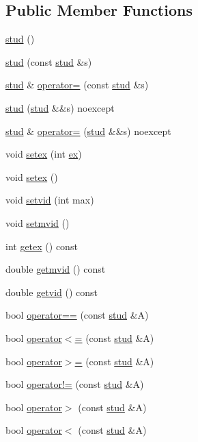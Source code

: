 \subsection*{Public Member Functions}
\begin{DoxyCompactItemize}
\item 
\mbox{\hyperlink{structstud_ab6ed07f01c0452711eccaaa57a75d669}{stud}} ()
\item 
\mbox{\hyperlink{structstud_a5d3f14694ec6a1eb8a20cd8538abadf5}{stud}} (const \mbox{\hyperlink{structstud}{stud}} \&s)
\item 
\mbox{\hyperlink{structstud}{stud}} \& \mbox{\hyperlink{structstud_a5c04ca87f8701c19bd0753345bf66b89}{operator=}} (const \mbox{\hyperlink{structstud}{stud}} \&s)
\item 
\mbox{\hyperlink{structstud_a806a780e55ad061bc78180d74a5c23bf}{stud}} (\mbox{\hyperlink{structstud}{stud}} \&\&s) noexcept
\item 
\mbox{\hyperlink{structstud}{stud}} \& \mbox{\hyperlink{structstud_a206a6086ce2d924230032e923ba8fd6b}{operator=}} (\mbox{\hyperlink{structstud}{stud}} \&\&s) noexcept
\item 
void \mbox{\hyperlink{structstud_af1a38e3c3ec728a5f05f60160ea1da58}{setex}} (int \mbox{\hyperlink{structstud_afa999423735c9497192e041f81d5988b}{ex}})
\item 
void \mbox{\hyperlink{structstud_a078cb288fc9ca808c827a079f0bdf724}{setex}} ()
\item 
void \mbox{\hyperlink{structstud_ae8ce76b8a594db8ed15a0a8116d1aa72}{setvid}} (int max)
\item 
void \mbox{\hyperlink{structstud_a5f882c5ca0c4c5351aaeebc76c86faaa}{setmvid}} ()
\item 
int \mbox{\hyperlink{structstud_a7b9cf0ded33d6a59ef2ef045d70980ba}{getex}} () const
\item 
double \mbox{\hyperlink{structstud_a79c64a6d3b9c76c24593588d30b8c661}{getmvid}} () const
\item 
double \mbox{\hyperlink{structstud_a9c5ae09dd2a7253655547095cb2ecdd1}{getvid}} () const
\item 
bool \mbox{\hyperlink{structstud_af75e6539277cd957250c0f787e1d836a}{operator==}} (const \mbox{\hyperlink{structstud}{stud}} \&A)
\item 
bool \mbox{\hyperlink{structstud_ad1f3ff522a5fa70a9f3e2a0da74e05a5}{operator$<$=}} (const \mbox{\hyperlink{structstud}{stud}} \&A)
\item 
bool \mbox{\hyperlink{structstud_a9429e8c92f864d5f6a70d907b35f0254}{operator$>$=}} (const \mbox{\hyperlink{structstud}{stud}} \&A)
\item 
bool \mbox{\hyperlink{structstud_a16dc0913be93da4cbe3b33794bd35349}{operator!=}} (const \mbox{\hyperlink{structstud}{stud}} \&A)
\item 
bool \mbox{\hyperlink{structstud_a81475ac8b96fabd20119059f86be5b91}{operator$>$}} (const \mbox{\hyperlink{structstud}{stud}} \&A)
\item 
bool \mbox{\hyperlink{structstud_a02cf4313f45a45c59f275472fb81526d}{operator$<$}} (const \mbox{\hyperlink{structstud}{stud}} \&A)
\end{DoxyCompactItemize}
